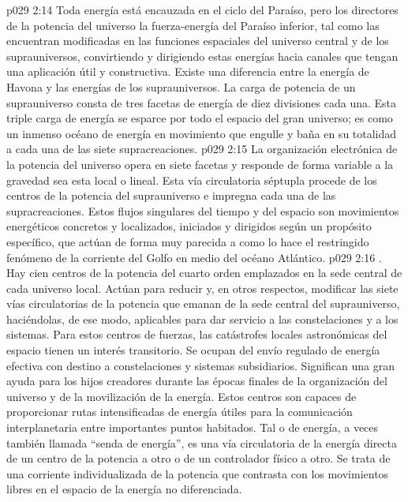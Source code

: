 \vs p029 2:14 Toda energía está encauzada en el ciclo del Paraíso, pero los directores de la potencia del universo  la fuerza\hyp{}energía del Paraíso inferior, tal como las encuentran modificadas en las funciones espaciales del universo central y de los suprauniversos, convirtiendo y dirigiendo estas energías hacia canales que tengan una aplicación útil y constructiva. Existe una diferencia entre la energía de Havona y las energías de los suprauniversos. La carga de potencia de un suprauniverso consta de tres facetas de energía de diez divisiones cada una. Esta triple carga de energía se esparce por todo el espacio del gran universo; es como un inmenso océano de energía en movimiento que engulle y baña en su totalidad a cada una de las siete supracreaciones.
\vs p029 2:15 La organización electrónica de la potencia del universo opera en siete facetas y responde de forma variable a la gravedad sea esta local o lineal. Esta vía circulatoria séptupla procede de los centros de la potencia del suprauniverso e impregna cada una de las supracreaciones. Estos flujos singulares del tiempo y del espacio son movimientos energéticos concretos y localizados, iniciados y dirigidos según un propósito específico, que actúan de forma muy parecida a como lo hace el restringido fenómeno de la corriente del Golfo en medio del océano Atlántico.
\vs p029 2:16 . Hay cien centros de la potencia del cuarto orden emplazados en la sede central de cada universo local. Actúan para reducir y, en otros respectos, modificar las siete vías circulatorias de la potencia que emanan de la sede central del suprauniverso, haciéndolas, de ese modo, aplicables para dar servicio a las constelaciones y a los sistemas. Para estos centros de fuerzas, las catástrofes locales astronómicas del espacio tienen un interés transitorio. Se ocupan del envío regulado de energía efectiva con destino a constelaciones y sistemas subsidiarios. Significan una gran ayuda para los hijos creadores durante las épocas finales de la organización del universo y de la movilización de la energía. Estos centros son capaces de proporcionar rutas intensificadas de energía útiles para la comunicación interplanetaria entre importantes puntos habitados. Tal  o  de energía, a veces también llamada “senda de energía”, es una vía circulatoria de la energía directa de un centro de la potencia a otro o de un controlador físico a otro. Se trata de una corriente individualizada de la potencia que contrasta con los movimientos libres en el espacio de la energía no diferenciada.
